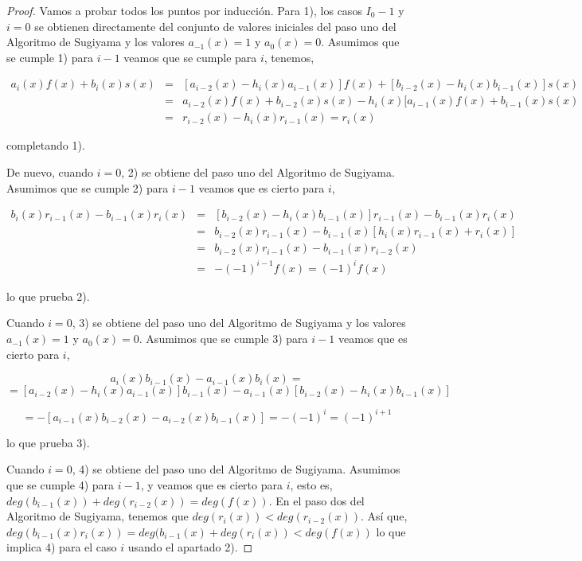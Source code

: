 \begin{proof}
Vamos a probar todos los puntos por inducción. Para 1), los casos $I_0-1$ y $i=0$ se obtienen directamente del conjunto de valores iniciales del paso uno del Algoritmo de Sugiyama y los valores $a_{-1}(x)=1$ y $a_0(x) = 0$. Asumimos que se cumple 1) para $i-1$ veamos que se cumple para $i$, tenemos, 


\begin{eqnarray*}
a_i(x)f(x) + b_i(x)s(x) & = & [a_{i-2}(x) -h_i(x)a_{i-1}(x)]f(x) + [b_{i-2}(x) -h_i(x)b_{i-1}(x)]s(x) \\
& = & a_{i-2}(x)f(x) + b_{i-2}(x)s(x) - h_i(x)[a_{i-1}(x)f(x) + b_{i-1}(x)s(x) \\
& = & r_{i-2}(x)-h_i(x)r_{i-1}(x) = r_i(x)
\end{eqnarray*}




completando 1).

De nuevo, cuando $i=0$, 2) se obtiene del paso uno del Algoritmo de Sugiyama. Asumimos que se cumple 2) para $i-1$ veamos que es cierto para $i$,


\begin{eqnarray*}
b_i(x)r_{i-1}(x) - b_{i-1}(x)r_i(x) & = & [b_{i-2}(x) -h_i(x)b_{i-1}(x)]r_{i-1}(x)-b_{i-1}(x)r_i(x) \\
& = & b_{i-2}(x)r_{i-1}(x) - b_{i-1}(x)[h_i(x)r_{i-1}(x) + r_i(x)] \\
& = &  b_{i-2}(x)r_{i-1}(x) - b_{i-1}(x)r_{i-2}(x) \\
& = & -(-1)^{i-1}f(x) = (-1)^if(x)
\end{eqnarray*}



lo que prueba 2).

Cuando $i=0$, 3) se obtiene del paso uno del Algoritmo de Sugiyama y los valores $a_{-1}(x)=1$ y $a_0(x) = 0$. Asumimos que se cumple 3) para $i-1$ veamos que es cierto para $i$,



\[ a_i(x)b_{i-1}(x) - a_{i-1}(x)b_i(x) =
\]
\[ =  [a_{i-2}(x) -h_i(x)a_{i-1}(x)]b_{i-1}(x) - a_{i-1}(x)[b_{i-2}(x) -h_i(x)b_{i-1}(x)] \]

\[ =  -[a_{i-1}(x)b_{i-2}(x) - a_{i-2}(x)b_{i-1}(x)] = -(-1)^i = (-1)^{i+1} \]




lo que prueba 3).

Cuando $i=0$, 4) se obtiene del paso uno del Algoritmo de Sugiyama. Asumimos que se cumple 4) para $i-1$, y veamos que es cierto para $i$, esto es,  $deg(b_{i-1}(x)) + deg(r_{i-2}(x)) = deg(f(x))$. En el paso dos del Algoritmo de Sugiyama, tenemos que $   deg(r_i(x)) < deg(r_{i-2}(x))$. Así que, $deg(b_{i-1}(x)r_i(x)) = deg(b_{i-1}(x) + deg(r_i(x)) < deg(f(x))$ lo que implica 4) para el caso $i$ usando el apartado 2).

\end{proof}

